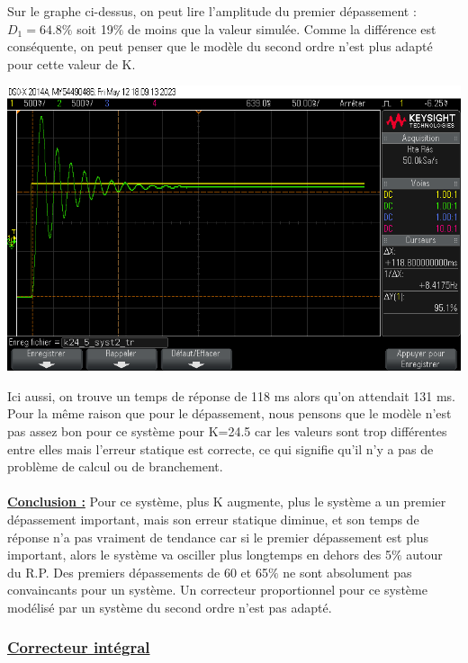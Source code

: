 \documentclass[12pt]{article}
\begin{document}
Sur le graphe ci-dessus, on peut lire l'amplitude du premier dépassement : $D_1 = 64.8\%$ soit 19$\%$ de moins que la valeur simulée. Comme la différence est conséquente, on peut penser que le modèle du second ordre n'est plus adapté pour cette valeur de K.
\begin{center}
    \includegraphics[width = 16 cm]{TP3/Syst_2/P/k24_5_syst2_tr.png}
\end{center}
Ici aussi, on trouve un temps de réponse de 118 ms alors qu'on attendait 131 ms. Pour la même raison que pour le dépassement, nous pensons que le modèle n'est pas assez bon pour ce système pour K=24.5 car les valeurs sont trop différentes entre elles mais l'erreur statique est correcte, ce qui signifie qu'il n'y a pas de problème de calcul ou de branchement.
\\\\\underline{\bf Conclusion :} Pour ce système, plus K augmente, plus le système a un premier dépassement important, mais son erreur statique diminue, et son temps de réponse n'a pas vraiment de tendance car si le premier dépassement est plus important, alors le système va osciller plus longtemps en dehors des 5$\%$ autour du R.P. Des premiers dépassements de 60 et 65$\%$ ne sont absolument pas convaincants pour un système. Un correcteur proportionnel pour ce système modélisé par un système du second ordre n'est pas adapté.
\subsubsection{\underline{\bf Correcteur intégral}}
\end{document}
